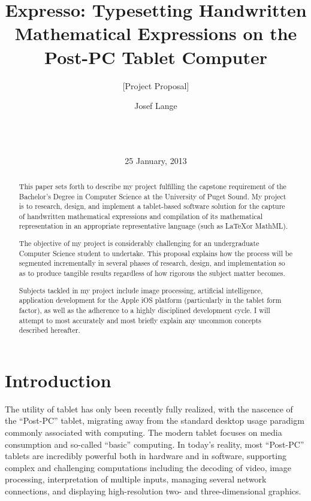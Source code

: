 \documentclass{acm_proc_article-sp}
\begin{document}
\title{ Expresso: Typesetting Handwritten Mathematical Expressions on the Post-PC Tablet Computer }
\subtitle{[Project Proposal]}


\author{
\alignauthor
Josef Lange\\
       \\
       \\
       \\
       }
       
\date{25 January, 2013}

\maketitle

\begin{abstract}
This paper sets forth to describe my project fulfilling the capstone requirement of the Bachelor's Degree in Computer Science at the University of Puget Sound. My project is to research, design, and implement a tablet-based software solution for the capture of handwritten mathematical expressions and compilation of its mathematical representation in an appropriate representative language (such as \LaTeX or MathML).

The objective of my project is considerably challenging for an undergraduate Computer Science student to undertake. This proposal explains how the process will be segmented incrementally in several phases of research, design, and implementation so as to produce tangible results regardless of how rigorous the subject matter becomes.

Subjects tackled in my project include image processing, artificial intelligence, application development for the Apple iOS platform (particularly in the tablet form factor), as well as the adherence to a highly disciplined development cycle. I will attempt to most accurately and most briefly explain any uncommon concepts described hereafter.
\end{abstract}

\section{Introduction}
The utility of tablet has only been recently fully realized, with the nascence of the ``Post-PC'' tablet, migrating away from the standard desktop usage paradigm commonly associated with computing. The modern tablet focuses on media consumption and so-called ``basic'' computing. In today's reality, most ``Post-PC'' tablets are incredibly powerful both in hardware and in software, supporting complex and challenging computations including the decoding of video, image processing, interpretation of multiple inputs, managing several network connections, and displaying high-resolution two- and three-dimensional graphics.
\end{document}
